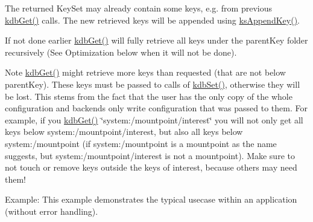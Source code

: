 The {\ttfamily returned} Key\+Set may already contain some keys, e.\+g. from previous \hyperlink{group__kdb_ga28e385fd9cb7ccfe0b2f1ed2f62453a1}{kdb\+Get()} calls. The new retrieved keys will be appended using \hyperlink{group__keyset_gaa5a1d467a4d71041edce68ea7748ce45}{ks\+Append\+Key()}.

If not done earlier \hyperlink{group__kdb_ga28e385fd9cb7ccfe0b2f1ed2f62453a1}{kdb\+Get()} will fully retrieve all keys under the {\ttfamily parent\+Key} folder recursively (See Optimization below when it will not be done).

\begin{DoxyNote}{Note}
\hyperlink{group__kdb_ga28e385fd9cb7ccfe0b2f1ed2f62453a1}{kdb\+Get()} might retrieve more keys than requested (that are not below parent\+Key). These keys must be passed to calls of \hyperlink{group__kdb_ga11436b058408f83d303ca5e996832bcf}{kdb\+Set()}, otherwise they will be lost. This stems from the fact that the user has the only copy of the whole configuration and backends only write configuration that was passed to them. For example, if you \hyperlink{group__kdb_ga28e385fd9cb7ccfe0b2f1ed2f62453a1}{kdb\+Get()} \char`\"{}system\+:/mountpoint/interest\char`\"{} you will not only get all keys below system\+:/mountpoint/interest, but also all keys below system\+:/mountpoint (if system\+:/mountpoint is a mountpoint as the name suggests, but system\+:/mountpoint/interest is not a mountpoint). Make sure to not touch or remove keys outside the keys of interest, because others may need them!
\end{DoxyNote}
\begin{DoxyParagraph}{Example\+:}
This example demonstrates the typical usecase within an application (without error handling).
\end{DoxyParagraph}

